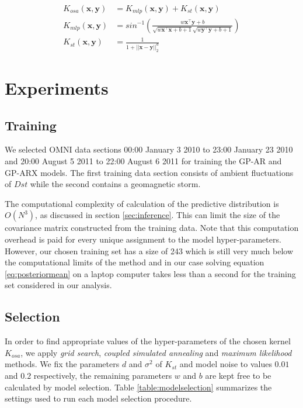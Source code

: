 \documentclass[sw, draft]{AGUTeX}
\begin{document}
\begin{article}
\begin{align}
    K_{osa}(\mathbf{x}, \mathbf{y}) & = K_{mlp}(\mathbf{x}, \mathbf{y}) + K_{st}(\mathbf{x}, \mathbf{y}) \label{eq:usedKernel} \\
    K_{mlp}(\mathbf{x}, \mathbf{y}) & = sin^{-1}(\frac{w\mathbf{x}^\intercal \mathbf{y} + b}{\sqrt{w\mathbf{x}^\intercal \mathbf{x} + b + 1} \sqrt{w\mathbf{y}^\intercal \mathbf{y} + b + 1}}) \\
    K_{st}(\mathbf{x}, \mathbf{y}) & = \frac{1}{1 + ||\mathbf{x} - \mathbf{y}||_{2}^d}
\end{align}

\section{Experiments} \label{sec:modeltraining}

\subsection*{Training}

We selected OMNI data sections 00:00 January 3 2010 to 23:00 January 23 2010 and 20:00 August 5 2011 to 22:00 August 6 2011 for training the GP-AR and GP-ARX models. The first training data section consists of ambient fluctuations of $Dst$ while the second contains a geomagnetic storm.

The computational complexity of calculation of the predictive distribution is $O(N^3)$, as discussed in section \ref{sec:inference}. This can limit the size of the covariance matrix constructed from the training data. Note that this computation overhead is paid for every unique assignment to the model hyper-parameters. However, our chosen training set has a size of 243 which is still very much below the computational limits of the method and in our case solving equation \ref{eq:posteriormean} on a laptop computer takes less than a second for the training set considered in our analysis. 

\subsection*{Selection}

In order to find appropriate values of the hyper-parameters of the chosen kernel $K_{osa}$, we apply \emph{grid search}, \emph{coupled simulated annealing} and \emph{maximum likelihood} methods. We fix the parameters $d$ and $\sigma^2$ of $K_{st}$ and model noise to values $0.01$ and $0.2$ respectively, the remaining parameters $w$ and $b$ are kept free to be calculated by model selection. Table \ref{table:modelselection} summarizes the settings used to run each model selection procedure.


\end{article}
\end{document}
